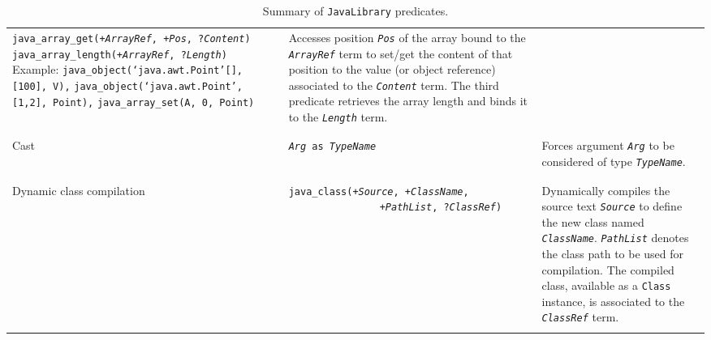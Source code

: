 \begin{table}
\begin{center}
{\begin{tabular}{p{2.3cm}p{6.6cm}p{4.6cm}}
    \texttt{java\_array\_get(+\textit{ArrayRef}, +\textit{Pos}, ?\textit{Content})}\newline
    \texttt{java\_array\_length(+\textit{ArrayRef}, ?\textit{Length})}\newline
    \newline
    Example:\newline
    \texttt{java\_object(`java.awt.Point'[], [100], V),}\newline
    \texttt{java\_object(`java.awt.Point', [1,2], Point),}\newline
    \texttt{java\_array\_set(A, 0, Point)}
    &
    Accesses position \texttt{\textit{Pos}} of the array bound to the
    \texttt{\textit{ArrayRef}} term to set/get the content of that position
    to the value (or object reference) associated to the \texttt{\textit{Content}} term.
    \newline
    The third predicate retrieves the array length and binds it to the
    \textit{\texttt{Length}} term.
    \\\\\hline\\
    Cast
    &
    \texttt{\textit{Arg} as \textit{TypeName}}\newline
    &
    Forces argument \texttt{\textit{Arg}} to be considered of type
    \texttt{\textit{TypeName}}.
    \\\\\hline\\
    Dynamic class \newline compilation
    &
    \texttt{java\_class(+\textit{Source}, +\textit{ClassName},}\newline
    \mbox{~~~~~~~~~~~~~~~~}\texttt{+\textit{PathList}, ?\textit{ClassRef})}\newline
    &
    Dynamically compiles the source text \texttt{\textit{Source}}
    to define the new class named \texttt{\textit{ClassName}}.
    \texttt{\textit{PathList}} denotes the class path to be used
    for compilation.
    The compiled class, available as a \texttt{Class} instance,
    is associated to the \texttt{\textit{ClassRef}} term.
    \\
    \\
    \hline\hline
    \end{tabular}
    }\end{center}
    \caption{Summary of \texttt{JavaLibrary} predicates.}
    \label{tab:summary-of-javalibrary-predicates}
\end{table}

